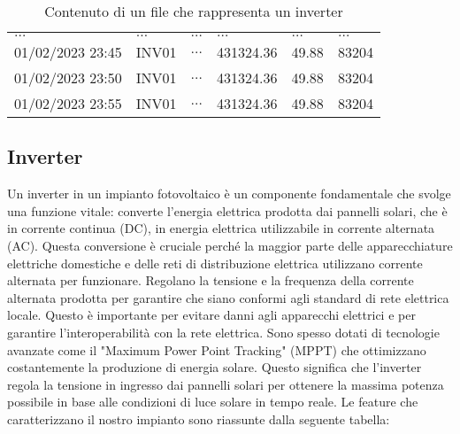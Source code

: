 \begin{table}[H]
\begin{center}
\begin{tabular}[c]{l|l|l|l|l|l}
			$\ldots$                                       &
			$\ldots$                                       &
			$\ldots$                                       &
			$\ldots$                                       &
			$\ldots$                                       &
			$\ldots$                                         \\
			01/02/2023 23:45                               &
			INV01                                          &
			$\ldots$                                       &
			431324.36                                      &
			49.88                                          &
			83204                                            \\
			01/02/2023 23:50                               &
			INV01                                          &
			$\ldots$                                       &
			431324.36                                      &
			49.88                                          &
			83204                                            \\
			01/02/2023 23:55                               &
			INV01                                          &
			$\ldots$                                       &
			431324.36                                      &
			49.88                                          &
			83204                                            \\
			\hline
		\end{tabular}
		\caption{Contenuto di un file che rappresenta un inverter}\label{tab:invsunto}
	\end{center}
\end{table}

\subsection{Inverter}
Un inverter in un impianto fotovoltaico è un componente fondamentale che svolge
una funzione vitale: converte l'energia elettrica prodotta dai pannelli solari,
che è in corrente continua (DC), in energia elettrica utilizzabile in corrente
alternata (AC). Questa conversione è cruciale perché la maggior parte delle
apparecchiature elettriche domestiche e delle reti di distribuzione elettrica
utilizzano corrente alternata per funzionare.
Regolano la
tensione e la frequenza della corrente alternata prodotta per garantire che
siano conformi agli standard di rete elettrica locale. Questo è importante
per evitare danni agli apparecchi elettrici e per garantire
l'interoperabilità con la rete elettrica.
Sono spesso dotati di
tecnologie avanzate come il "Maximum Power Point Tracking" (MPPT) che
ottimizzano costantemente la produzione di energia solare. Questo significa
che l'inverter regola la tensione in ingresso dai pannelli solari per
ottenere la massima potenza possibile in base alle condizioni di luce solare
in tempo reale.
Le feature che caratterizzano il nostro impianto sono riassunte dalla seguente
tabella:

